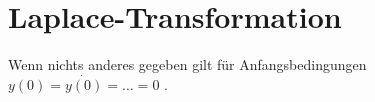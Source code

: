 \section{Laplace-Transformation}
Wenn nichts anderes gegeben gilt für Anfangsbedingungen $y(0) = \dot{y(0)} =  \ldots = 0$ .
